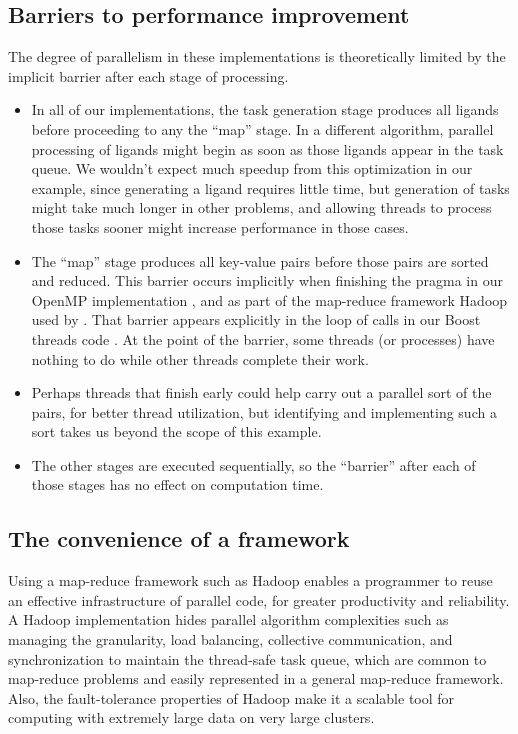 \documentclass[letterpaper,10pt,openany,oneside]{sphinxmanual}
\begin{document}
\subsection{Barriers to performance improvement}
\label{evaluation/evaluation:barriers-to-performance-improvement}
The degree of parallelism in these implementations is theoretically limited by the implicit barrier after each stage of processing.
\begin{itemize}
\item {} 
In all of our implementations, the task generation stage produces all ligands before proceeding to any the “map” stage.  In a different algorithm, parallel processing of ligands might begin as soon as those ligands appear in the task queue. We wouldn’t expect much speedup from this optimization in our example, since generating a ligand requires little time, but generation of tasks might take much longer in other problems, and allowing threads to process those tasks sooner might increase performance in those cases.

\item {} 
The “map” stage produces all key-value pairs before those pairs are sorted and reduced. This barrier occurs implicitly when finishing the  pragma in our OpenMP implementation , and as part of the map-reduce framework Hadoop used by . That barrier appears explicitly in the loop of  calls in our Boost threads code . At the point of the barrier, some threads (or processes) have nothing to do while other threads complete their work.

\item {} 
Perhaps threads that finish early could help carry out a parallel sort of the pairs, for better thread utilization, but identifying and implementing such a sort takes us beyond the scope of this example.

\item {} 
The other stages are executed sequentially, so the ``barrier'' after each of those stages has no effect on computation time.

\end{itemize}


\subsection{The convenience of a framework}
\label{evaluation/evaluation:the-convenience-of-a-framework}
Using a map-reduce framework such as Hadoop enables a programmer to reuse an effective infrastructure of parallel code, for greater productivity and reliability. A Hadoop implementation hides parallel algorithm complexities such as managing the granularity, load balancing, collective communication, and synchronization to maintain the thread-safe task queue, which are common to map-reduce problems and easily represented in a general map-reduce framework. Also, the fault-tolerance properties of Hadoop make it a scalable tool for computing with extremely large data on very large clusters.
\end{document}
